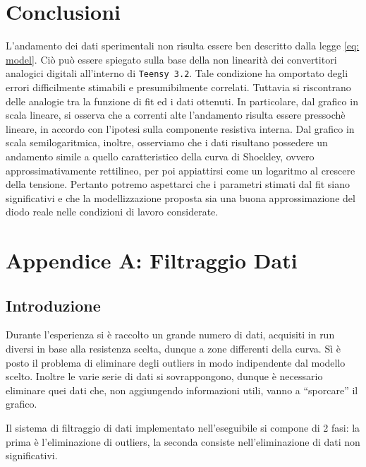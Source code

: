 \documentclass{article}[a4paper, oneside, 11pt]
\begin{document}
\section{Conclusioni}
L'andamento dei dati sperimentali non risulta essere ben descritto dalla legge
\eqref{eq: model}. Ciò può essere spiegato sulla base della non linearità dei
convertitori analogici digitali all'interno di \verb+Teensy 3.2+. Tale condizione ha omportato
degli errori difficilmente stimabili e presumibilmente correlati. Tuttavia si
riscontrano delle analogie tra la funzione di fit ed i dati ottenuti. In
particolare, dal grafico in scala lineare, si osserva che a correnti alte
l'andamento risulta essere pressoch\`e lineare, in accordo con l'ipotesi sulla
componente resistiva interna. Dal grafico in scala semilogaritmica, inoltre, osserviamo
che i dati risultano possedere un andamento simile a quello caratteristico 
della curva di Shockley, ovvero approssimativamente rettilineo, per poi appiattirsi come un logaritmo al crescere
della tensione.
Pertanto potremo aspettarci che i parametri stimati dal fit siano significativi e che la modellizzazione proposta sia una buona approssimazione del diodo reale nelle condizioni di lavoro considerate.

\section{Appendice A: Filtraggio Dati}\label{app: A}

\subsection{Introduzione}
Durante l’esperienza si è raccolto un grande numero di dati, acquisiti in
run diversi in base alla resistenza scelta, dunque a zone differenti della
curva. Sì è posto il problema di eliminare degli outliers in modo
indipendente dal modello scelto. Inoltre le varie serie di dati si
sovrappongono, dunque è necessario eliminare quei dati che, non aggiungendo
informazioni utili, vanno a “sporcare” il grafico.

Il sistema di filtraggio di dati implementato nell'eseguibile si compone di 2
fasi: la prima è l’eliminazione di outliers, la seconda consiste
nell'eliminazione di dati non significativi.
\end{document}

